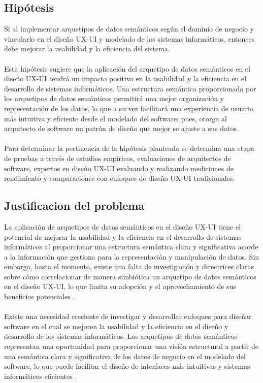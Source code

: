 \documentclass[12pt,a4paper]{article}
\begin{document}
\subsection{Hipótesis}
\label{sec:2a}
Si al implementar arquetipos de datos semánticos según el dominio de negocio y vincularlo en el diseño UX-UI y modelado de los sistemas informáticos, entonces debe mejorar la usabilidad y la eficiencia del sistema.
\\\\
Esta hipótesis sugiere que la aplicación del arquetipo de datos semánticos en el diseño UX-UI tendrá un impacto positivo en la usabilidad y la eficiencia en el desarrollo de sistemas informáticos. Una estructura semántica proporcionada por los arquetipos de datos semánticos permitirá una mejor organización y representación de los datos, lo que a su vez facilitará una experiencia de usuario más intuitiva y eficiente desde el modelado del software; pues, otorga al arquitecto de software un patrón de diseño que mejor se ajuste a sus datos. 
\\\\
Para determinar la pertinencia de la hipótesis planteada se determina una etapa de pruebas a través de estudios empíricos, evaluaciones de arquitectos de software, expertos en diseño UX-UI evaluando y realizando mediciones de rendimiento y comparaciones con enfoques de diseño UX-UI tradicionales.

\subsection{Justificacion del problema}
\label{sec:3}
La aplicación de arquetipos de datos semánticos en el diseño UX-UI tiene el potencial de mejorar la usabilidad y la eficiencia en el desarrollo de sistemas informáticos al proporcionar una estructura semántica clara y significativa acorde a la información que gestiona para la representación y manipulación de datos. Sin embargo, hasta el momento, existe una falta de investigación y directrices claras sobre cómo correlacionar de manera simbiótica un arquetipo de datos semánticos en el diseño UX-UI, lo que limita su adopción y el aprovechamiento de sus beneficios potenciales \cite{Garcia2023}.
\\\\
Existe una necesidad creciente de investigar y desarrollar enfoques para diseñar software en el cual se mejoren la usabilidad y la eficiencia en el diseño y desarrollo de los sistemas informáticos. Los arquetipos de datos semánticos representan una oportunidad para proporcionar una visión estructural a partir de una semántica clara y significativa de los datos de negocio en el modelado del software, lo que puede facilitar el diseño de interfaces más intuitivas y sistemas informáticos eficientes \cite{Garcia2023}.
\end{document}
